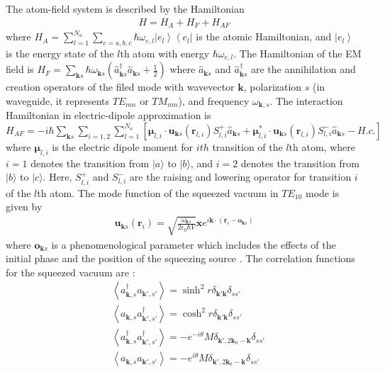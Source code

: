 \documentclass[aps,showpacs,twocolumn,twoside,groupedaddress]{revtex4}
\let\vec\bm
\begin{document}

The atom-field system is described by the Hamiltonian \begin{equation}
  \label{hamltonian}
  \begin{gathered}
H=H_{A}+H_{F}+H_{AF}
 \end{gathered}
\end{equation}
where
$H_{A}=\sum_{l=1}^{N_a}\sum_{e=a,b,c}\hbar\omega_{e,l}\left|e_{l}\right\rangle \left\langle e_{l}\right|$  
is the atomic Hamiltonian, and $ \left|e_{l}\right\rangle $ is the energy state of the $l$th atom with energy $\hbar\omega_{e,l}$. The Hamiltonian of the EM field is
$H_{F}=\sum_{\vec{k}s}\hbar\omega_{\vec{k}s}(\hat{a}_{\vec{k}s}^{\dagger}\hat{a}_{\vec{k}s}+\frac{1}{2})$
where $\hat{a}_{\vec{k}s}$ and $\hat{a}_{\vec{k}s}^{\dagger}$ are the annihilation and creation operators of the filed mode with wavevector $ \vec{k}$, polarization $s$ (in waveguide, it represents $TE_{mn}$ or $TM_{mn}$), and frequency $\omega_{\vec{k},s}$. The interaction Hamiltonian in electric-dipole approximation is
$H_{AF}=-i\hbar\sum_{\vec{k}s}\sum_{i=1,2}\sum_{l=1}^{N_{a}}[\vec{\mu}_{l,i}\cdot\vec{u}_{\vec{k}s}(\vec{r}_{l,i})S_{l,i}^{+}\hat{a}_{\vec{k}s}+\vec{\mu}_{l,i}^{*}\cdot\vec{u}_{\vec{k}s}(\vec{r}_{l,i})S_{l,i}^{-}\hat{a}_{\vec{k}s}-H.c.]$
where $ \vec{\mu}_{l,i} $ is the electric dipole moment for $ith$ transition of the $l$th atom, where $i=1$ denotes the transition from $|a\rangle$ to $|b\rangle$, and $i=2$ denotes the transition from $|b\rangle$ to $|c\rangle$. Here, $ S_{l,i}^{+} $ and $S_{l,i}^{-} $ are the raising and lowering operator for transition $i$ of the $l$th atom. The mode function of the squeezed vacuum in $TE_{10}$ mode is given by
\begin{equation}
  \label{eq2b}
  \begin{gathered}
\vec{u}_{\vec{k}s}(\vec{r}_{i})=\sqrt{\frac{\omega_{\vec{k}s}}{2\epsilon_{0}\hbar V}}\vec{x}e^{i\vec{k}\cdot(\vec{r}_{i}-\vec{o}_{\vec{k}s})}
 \end{gathered}
\end{equation}
where $\vec{o}_{\vec{k}s} $ is a phenomenological parameter which includes the effects of the initial phase and the position of the squeezing source \cite{You2018}. The correlation functions for the squeezed vacuum are \cite{scully1999quantum}:
\begin{equation}
\label{eq0a}
\begin{split}
& \left\langle a_{\vec{k},s}^{\dagger}a_{\vec{k}',s'}\right\rangle =\sinh^{2}r\delta_{\vec{k}'\vec{k}}\delta_{ss'} \\
& \left\langle a_{\vec{k},s}a_{\vec{k}',s'}^{\dagger}\right\rangle =\cosh^{2}r\delta_{\vec{k}'\vec{k}}\delta_{ss'}\\
& \left\langle a_{\vec{k},s}^{\dagger}a_{\vec{k}',s'}^{\dagger}\right\rangle =-e^{-i\theta}M\delta_{\vec{k}',2\vec{k}_{0}-\vec{k}}\delta_{ss'}\\
&\left\langle a_{\vec{k},s}a_{\vec{k}',s'}\right\rangle =-e^{i\theta}M\delta_{\vec{k}',2\vec{k}_{0}-\vec{k}}\delta_{ss'}
\end{split}
\end{equation}
\end{document}
